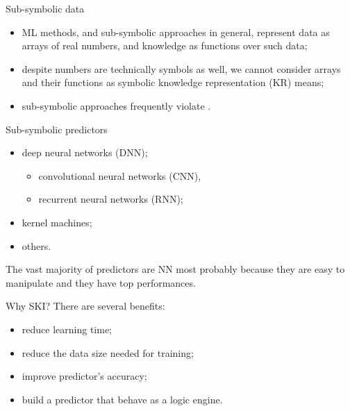 \documentclass[presentation]{beamer}\mode<presentation>{\usetheme{AMSBolognaFC}}
\begin{document}
\begin{frame}[c]{Sub-symbolic data}
    \begin{itemize}
        \item ML methods, and sub-symbolic approaches in general, represent data as arrays of real numbers, and knowledge as functions over such data;
        \item despite numbers are technically symbols as well, we cannot consider arrays and their functions as symbolic knowledge representation (KR) means;
        \item sub-symbolic approaches frequently violate .
    \end{itemize}
\end{frame}

\begin{frame}[c]{Sub-symbolic predictors}
    \begin{itemize}
        \item deep neural networks (DNN);
        \begin{itemize}
            \item convolutional neural networks (CNN),
            \item recurrent neural networks (RNN);
        \end{itemize}
        \item kernel machines;
        \item others.
    \end{itemize}
    \vfill
    The vast majority of predictors are NN most probably because they are easy to manipulate and they have top performances.
\end{frame}

\begin{frame}[c]{Why SKI?}
    There are several benefits:
\begin{itemize}
    \item reduce learning time;
    \item reduce the data size needed for training;
    \item improve predictor's accuracy;
    \item build a predictor that behave as a logic engine.
\end{itemize}
%
\end{frame}


\end{document}
